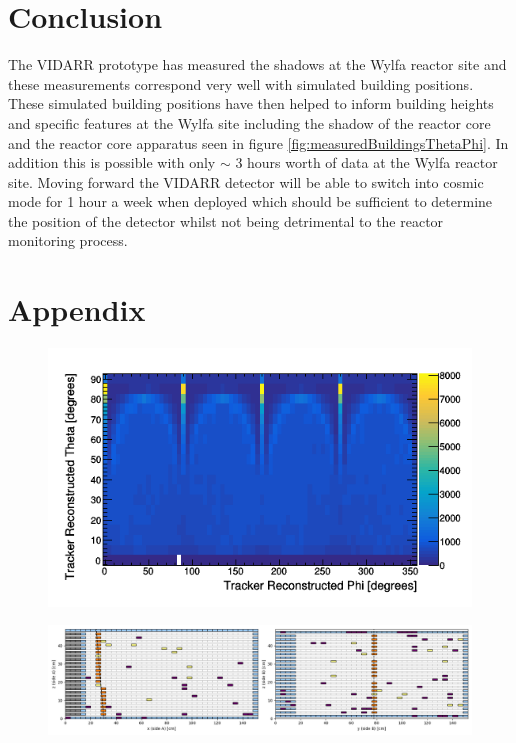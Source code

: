 \documentclass[12pt,a4paper]{article}
\begin{document}
\section{Conclusion} \label{sec:Conclusion}
 The VIDARR prototype has measured the shadows at the Wylfa reactor site and these measurements correspond very well with simulated building positions. These simulated building positions have then helped to inform building heights and specific features at the Wylfa site including the shadow of the reactor core and the reactor core apparatus seen in figure \ref{fig:measuredBuildingsThetaPhi}. In addition this is possible with only $\sim$ 3 hours worth of data at the Wylfa reactor site. Moving forward the VIDARR detector will be able to switch into cosmic mode for 1 hour a week when deployed which should be sufficient to determine the position of the detector whilst not being detrimental to the reactor monitoring process.

\section{Appendix} \label{sec:appendix}
\begin{figure}[H]
 \centering
 \includegraphics[width=0.7\linewidth]{ReconstructedPhiTheta/pvsTFiduicalHemisphere.png}
 \label{fig:pvstFiducialHem}
\end{figure}

\begin{figure}[H]
 \centering
 \includegraphics[width=1.0\linewidth]{testEventNewScheme.png}
 \label{fig:testEventNewScheme}
\end{figure}
\end{document}
